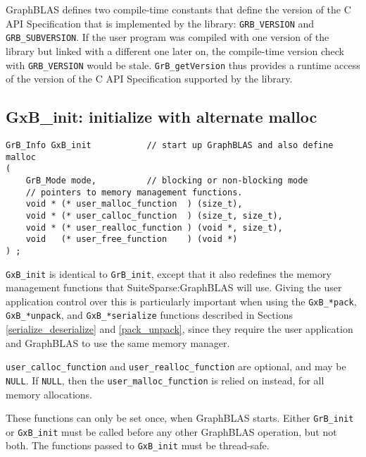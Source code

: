 \documentclass[12pt]{article}
\begin{document}
GraphBLAS defines two compile-time constants that
define the version of the C API Specification
that is implemented by the library:
\verb'GRB_VERSION' and \verb'GRB_SUBVERSION'.
If the user program was compiled with one
version of the library but linked with a different one later on, the
compile-time version check with \verb'GRB_VERSION' would be stale.
\verb'GrB_getVersion' thus provides a runtime access of the version of the C
API Specification supported by the library.

\newpage
\subsection{{\sf GxB\_init:} initialize with alternate malloc} %
\label{xinit}

\begin{mdframed}[userdefinedwidth=6in]
{\footnotesize
\begin{verbatim}
GrB_Info GxB_init           // start up GraphBLAS and also define malloc
(
    GrB_Mode mode,          // blocking or non-blocking mode
    // pointers to memory management functions.
    void * (* user_malloc_function  ) (size_t),
    void * (* user_calloc_function  ) (size_t, size_t),
    void * (* user_realloc_function ) (void *, size_t),
    void   (* user_free_function    ) (void *)
) ;
\end{verbatim}
}\end{mdframed}

\verb'GxB_init' is identical to \verb'GrB_init', except that it also redefines
the memory management functions that SuiteSparse:GraphBLAS will use.  Giving
the user application control over this is particularly important when using the
\verb'GxB_*pack',
\verb'GxB_*unpack', and \verb'GxB_*serialize' functions described in
Sections \ref{serialize_deserialize} and \ref{pack_unpack},
since they require the user application and
GraphBLAS to use the same memory manager.

\verb'user_calloc_function' and \verb'user_realloc_function' are optional, and
may be \verb'NULL'.  If \verb'NULL', then the \verb'user_malloc_function' is
relied on instead, for all memory allocations.

These functions can only be set once, when GraphBLAS starts.   Either
\verb'GrB_init' or \verb'GxB_init' must be called before any other GraphBLAS
operation, but not both.  The functions passed to \verb'GxB_init' must be
thread-safe.
\end{document}
